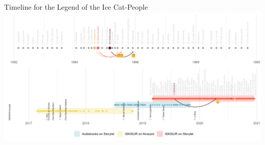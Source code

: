 \begin{frame}{Timeline for the Legend of the Ice Cat-People}
{{}}
\includegraphics[width=\textwidth]{../R/figures/timeline}
\end{frame}
